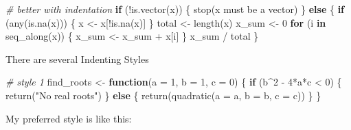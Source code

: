 \documentclass[
]{book}
\newenvironment{Shaded}{\begin{snugshade}}{\end{snugshade}}
\newcommand{\AttributeTok}[1]{\textcolor[rgb]{0.77,0.63,0.00}{#1}}
\newcommand{\CommentTok}[1]{\textcolor[rgb]{0.56,0.35,0.01}{\textit{#1}}}
\newcommand{\ControlFlowTok}[1]{\textcolor[rgb]{0.13,0.29,0.53}{\textbf{#1}}}
\newcommand{\DecValTok}[1]{\textcolor[rgb]{0.00,0.00,0.81}{#1}}
\newcommand{\FunctionTok}[1]{\textcolor[rgb]{0.00,0.00,0.00}{#1}}
\newcommand{\NormalTok}[1]{#1}
\newcommand{\OtherTok}[1]{\textcolor[rgb]{0.56,0.35,0.01}{#1}}
\newcommand{\SpecialCharTok}[1]{\textcolor[rgb]{0.00,0.00,0.00}{#1}}
\newcommand{\StringTok}[1]{\textcolor[rgb]{0.31,0.60,0.02}{#1}}
\begin{document}
\begin{Shaded}
\begin{Highlighting}[]
\CommentTok{\# better with indentation}
\ControlFlowTok{if}\NormalTok{ (}\SpecialCharTok{!}\FunctionTok{is.vector}\NormalTok{(x)) \{}
  \FunctionTok{stop}\NormalTok{(}\StringTok{\textquotesingle{}x must be a vector\textquotesingle{}}\NormalTok{)}
\NormalTok{\} }\ControlFlowTok{else}\NormalTok{ \{}
  \ControlFlowTok{if}\NormalTok{ (}\FunctionTok{any}\NormalTok{(}\FunctionTok{is.na}\NormalTok{(x))) \{}
\NormalTok{    x }\OtherTok{\textless{}{-}}\NormalTok{ x[}\SpecialCharTok{!}\FunctionTok{is.na}\NormalTok{(x)]}
\NormalTok{  \}}
\NormalTok{  total }\OtherTok{\textless{}{-}} \FunctionTok{length}\NormalTok{(x)}
\NormalTok{  x\_sum }\OtherTok{\textless{}{-}} \DecValTok{0}
  \ControlFlowTok{for}\NormalTok{ (i }\ControlFlowTok{in} \FunctionTok{seq\_along}\NormalTok{(x)) \{}
\NormalTok{    x\_sum }\OtherTok{\textless{}{-}}\NormalTok{ x\_sum }\SpecialCharTok{+}\NormalTok{ x[i]}
\NormalTok{  \}}
\NormalTok{  x\_sum }\SpecialCharTok{/}\NormalTok{ total}
\NormalTok{\}}
\end{Highlighting}
\end{Shaded}

There are several Indenting Styles

\begin{Shaded}
\begin{Highlighting}[]
\CommentTok{\# style 1}
\NormalTok{find\_roots }\OtherTok{\textless{}{-}} \ControlFlowTok{function}\NormalTok{(}\AttributeTok{a =} \DecValTok{1}\NormalTok{, }\AttributeTok{b =} \DecValTok{1}\NormalTok{, }\AttributeTok{c =} \DecValTok{0}\NormalTok{) }
\NormalTok{\{}
  \ControlFlowTok{if}\NormalTok{ (b}\SpecialCharTok{\^{}}\DecValTok{2} \SpecialCharTok{{-}} \DecValTok{4}\SpecialCharTok{*}\NormalTok{a}\SpecialCharTok{*}\NormalTok{c }\SpecialCharTok{\textless{}} \DecValTok{0}\NormalTok{) }
\NormalTok{  \{}
    \FunctionTok{return}\NormalTok{(}\StringTok{"No real roots"}\NormalTok{)}
\NormalTok{  \} }\ControlFlowTok{else} 
\NormalTok{  \{}
    \FunctionTok{return}\NormalTok{(}\FunctionTok{quadratic}\NormalTok{(}\AttributeTok{a =}\NormalTok{ a, }\AttributeTok{b =}\NormalTok{ b, }\AttributeTok{c =}\NormalTok{ c))}
\NormalTok{  \}}
\NormalTok{\}}
\end{Highlighting}
\end{Shaded}

My preferred style is like this:
\end{document}

